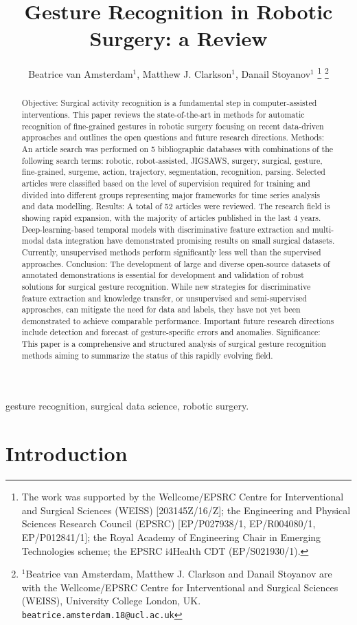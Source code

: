 \documentclass[journal]{IEEEtran}
\title{Gesture Recognition in Robotic Surgery: a Review}
\author{
Beatrice van Amsterdam$^{1}$, Matthew J. Clarkson$^{1}$, Danail Stoyanov$^{1}$
\thanks{The work was supported by the Wellcome/EPSRC Centre for Interventional and Surgical Sciences (WEISS) [203145Z/16/Z]; the Engineering and Physical Sciences Research Council (EPSRC) [EP/P027938/1, EP/R004080/1, EP/P012841/1]; the Royal Academy of Engineering Chair in Emerging Technologies scheme; the EPSRC i4Health CDT (EP/S021930/1).}
\thanks{$^{1}$Beatrice van Amsterdam, Matthew J. Clarkson and Danail Stoyanov are with the Wellcome/EPSRC Centre for Interventional and Surgical Sciences (WEISS), University College London, UK. {\tt\small beatrice.amsterdam.18@ucl.ac.uk}}
}
\begin{document}
\maketitle

\begin{abstract}
Objective: Surgical activity recognition is a fundamental step in computer-assisted interventions. This paper reviews the state-of-the-art in methods for automatic recognition of fine-grained gestures in robotic surgery focusing on recent data-driven approaches and outlines the open questions and future research directions. 
Methods: An article search was performed on 5 bibliographic databases with combinations of the following search terms: robotic,  robot-assisted, JIGSAWS, surgery, surgical, gesture, fine-grained, surgeme, action, trajectory, segmentation, recognition, parsing. 
Selected articles were classified based on the level of supervision required for training and divided into different groups representing major frameworks for time series analysis and data modelling. 
Results: A total of 52 articles were reviewed. The research field is showing rapid expansion, with the majority of articles published in the last 4 years. Deep-learning-based temporal models with discriminative feature extraction and multi-modal data integration have demonstrated promising results on small surgical datasets. Currently, unsupervised methods perform significantly less well than the supervised approaches. 
Conclusion: The development of large and diverse open-source datasets of annotated demonstrations is essential for development and validation of robust solutions for surgical gesture recognition. While new strategies for discriminative feature extraction and knowledge transfer, or unsupervised and semi-supervised approaches, can mitigate the need for data and labels, they have not yet been demonstrated to achieve comparable performance. Important future research directions include detection and forecast of gesture-specific errors and anomalies. 
Significance: This paper is a comprehensive and structured analysis of surgical gesture recognition methods aiming to summarize the status of this rapidly evolving field.
\end{abstract}

\begin{IEEEkeywords}
gesture recognition, surgical data science, robotic surgery.
\end{IEEEkeywords}

\IEEEpeerreviewmaketitle

\section{Introduction}
\end{document}
